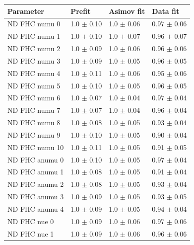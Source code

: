 \begin{table}[ht!]
  \center
  \begin{tabular}{llll}
    \toprule
    Parameter & Prefit & \Gls{Asimov} fit & Data fit \\\midrule
    \Gls{ND} \Gls{FHC} \Gls{numu} 0& 1.0 $\pm$ 0.10 & 1.0 $\pm$ 0.06 & 0.97 $\pm$ 0.06 \\ 
    \Gls{ND} \Gls{FHC} \Gls{numu} 1& 1.0 $\pm$ 0.10 & 1.0 $\pm$ 0.07 & 0.96 $\pm$ 0.07 \\ 
    \Gls{ND} \Gls{FHC} \Gls{numu} 2& 1.0 $\pm$ 0.09 & 1.0 $\pm$ 0.06 & 0.96 $\pm$ 0.06 \\ 
    \Gls{ND} \Gls{FHC} \Gls{numu} 3& 1.0 $\pm$ 0.09 & 1.0 $\pm$ 0.05 & 0.96 $\pm$ 0.05 \\ 
    \Gls{ND} \Gls{FHC} \Gls{numu} 4& 1.0 $\pm$ 0.11 & 1.0 $\pm$ 0.06 & 0.95 $\pm$ 0.06 \\ 
    \Gls{ND} \Gls{FHC} \Gls{numu} 5& 1.0 $\pm$ 0.10 & 1.0 $\pm$ 0.05 & 0.96 $\pm$ 0.05 \\
    \Gls{ND} \Gls{FHC} \Gls{numu} 6& 1.0 $\pm$ 0.07 & 1.0 $\pm$ 0.04 & 0.97 $\pm$ 0.04 \\ 
    \Gls{ND} \Gls{FHC} \Gls{numu} 7& 1.0 $\pm$ 0.07 & 1.0 $\pm$ 0.04 & 0.96 $\pm$ 0.04 \\ 
    \Gls{ND} \Gls{FHC} \Gls{numu} 8& 1.0 $\pm$ 0.08 & 1.0 $\pm$ 0.05 & 0.93 $\pm$ 0.04 \\ 
    \Gls{ND} \Gls{FHC} \Gls{numu} 9& 1.0 $\pm$ 0.10 & 1.0 $\pm$ 0.05 & 0.90 $\pm$ 0.04 \\ 
    \Gls{ND} \Gls{FHC} \Gls{numu} 10& 1.0 $\pm$ 0.11 & 1.0 $\pm$ 0.05 & 0.91 $\pm$ 0.05 \\ 
    \Gls{ND} \Gls{FHC} \Gls{anumu} 0& 1.0 $\pm$ 0.10 & 1.0 $\pm$ 0.05 & 0.97 $\pm$ 0.04 \\ 
    \Gls{ND} \Gls{FHC} \Gls{anumu} 1& 1.0 $\pm$ 0.08 & 1.0 $\pm$ 0.05 & 0.91 $\pm$ 0.04 \\ 
    \Gls{ND} \Gls{FHC} \Gls{anumu} 2& 1.0 $\pm$ 0.08 & 1.0 $\pm$ 0.05 & 0.93 $\pm$ 0.04 \\ 
    \Gls{ND} \Gls{FHC} \Gls{anumu} 3& 1.0 $\pm$ 0.09 & 1.0 $\pm$ 0.05 & 0.93 $\pm$ 0.05 \\ 
    \Gls{ND} \Gls{FHC} \Gls{anumu} 4& 1.0 $\pm$ 0.09 & 1.0 $\pm$ 0.05 & 0.94 $\pm$ 0.04 \\ 
    \Gls{ND} \Gls{FHC} \Gls{nue} 0 & 1.0 $\pm$ 0.09 & 1.0 $\pm$ 0.06 & 0.97 $\pm$ 0.06 \\ 
    \Gls{ND} \Gls{FHC} \Gls{nue} 1 & 1.0 $\pm$ 0.09 & 1.0 $\pm$ 0.06 & 0.96 $\pm$ 0.06 \\ 

\end{tabular}
\end{table}
